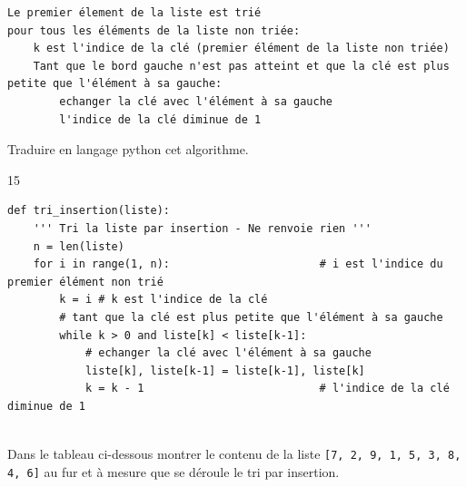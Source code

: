 \documentclass[a4paper,10pt]{report}
\begin{document}
\begin{verbatim}
Le premier élement de la liste est trié
pour tous les éléments de la liste non triée:
    k est l'indice de la clé (premier élément de la liste non triée)
    Tant que le bord gauche n'est pas atteint et que la clé est plus petite que l'élément à sa gauche:
        echanger la clé avec l'élément à sa gauche
        l'indice de la clé diminue de 1
\end{verbatim}

\begin{enumerate}
    \item Traduire en langage python cet algorithme.
    

    \begin{answer}{1}{5}
        \begin{verbatim}
def tri_insertion(liste):
    ''' Tri la liste par insertion - Ne renvoie rien '''
    n = len(liste)
    for i in range(1, n):                       # i est l'indice du premier élément non trié
        k = i # k est l'indice de la clé
        # tant que la clé est plus petite que l'élément à sa gauche
        while k > 0 and liste[k] < liste[k-1]:     
            # echanger la clé avec l'élément à sa gauche
            liste[k], liste[k-1] = liste[k-1], liste[k]
            k = k - 1                           # l'indice de la clé diminue de 1
    
        \end{verbatim}
    \end{answer}


    \begin{minipage}{0.48\linewidth}
        \item Dans le tableau ci-dessous montrer le contenu de la liste \verb|[7, 2, 9, 1, 5, 3, 8, 4, 6]| au fur et à mesure que se déroule le tri par insertion.
    

\end{minipage}
\end{enumerate}
\end{document}
